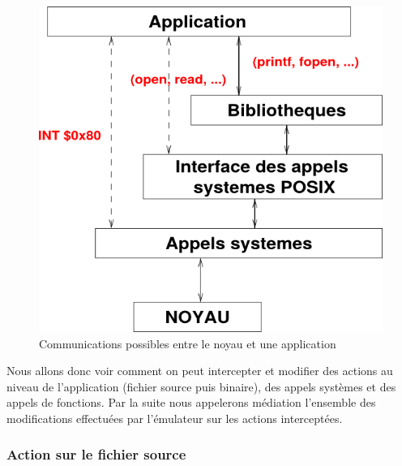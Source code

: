 \begin{figure}[H]
 \centering
 \includegraphics[scale=0.5]{Pictures/png/Communication_application_noyau_v1.png}
 \caption{Communications possibles entre le noyau et une application}
 \label{AS_Communication}
\end{figure}

Nous allons donc voir comment on peut intercepter et modifier des actions au niveau de l'application (fichier source puis binaire), des appels systèmes et des appels de fonctions. Par la suite nous appelerons médiation l'ensemble des modifications effectuées par l'émulateur sur les actions interceptées.

\subsubsection{Action sur le fichier source}

